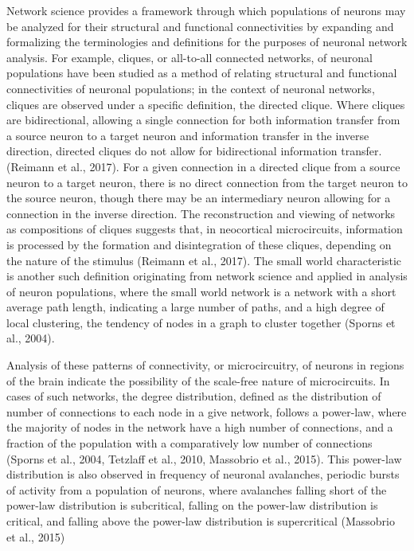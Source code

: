 \documentclass[11pt]{article}
\begin{document}
Network science provides a framework through which populations of neurons may be analyzed for their structural and functional connectivities by expanding and formalizing the terminologies and definitions for the purposes of neuronal network analysis. For example, cliques, or all-to-all connected networks, of neuronal populations have been studied as a method of relating structural and functional connectivities of neuronal populations; in the context of neuronal networks, cliques are observed under a specific definition, the directed clique. Where cliques are bidirectional, allowing a single connection for both information transfer from a source neuron to a target neuron and information transfer in the inverse direction, directed cliques do not allow for bidirectional information transfer. (Reimann et al., 2017). For a given connection in a directed clique from a source neuron to a target neuron, there is no direct connection from the target neuron to the source neuron, though there may be an intermediary neuron allowing for a connection in the inverse direction. The reconstruction and viewing of networks as compositions of cliques suggests that, in neocortical microcircuits, information is processed by the formation and disintegration of these cliques, depending on the nature of the stimulus (Reimann et al., 2017). The small world characteristic is another such definition originating from network science and applied in analysis of neuron populations, where the small world network is a network with a short average path length, indicating a large number of paths, and a high degree of local clustering, the tendency of nodes in a graph to cluster together (Sporns et al., 2004).\par

Analysis of these patterns of connectivity, or microcircuitry, of neurons in regions of the brain indicate the possibility of the scale-free nature of microcircuits. In cases of such networks, the degree distribution, defined as the distribution of number of connections to each node in a give network, follows a power-law, where the majority of nodes in the network have a high number of connections, and a fraction of the population with a comparatively low number of connections (Sporns et al., 2004, Tetzlaff et al., 2010, Massobrio et al., 2015). This power-law distribution is also observed in frequency of neuronal avalanches, periodic bursts of activity from a population of neurons, where avalanches falling short of the power-law distribution is subcritical, falling on the power-law distribution is critical, and falling above the power-law distribution is supercritical (Massobrio et al., 2015)\par
\end{document}
